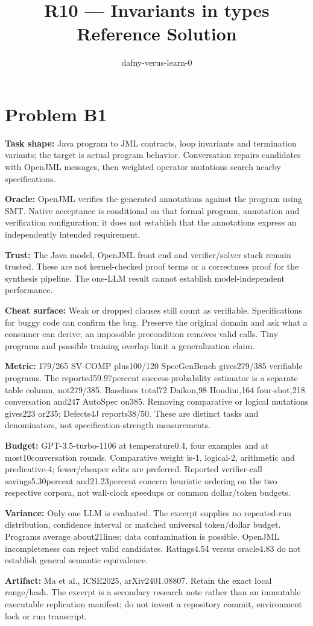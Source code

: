 \documentclass[11pt]{article}
\title{R10 --- Invariants in types \\ \large Reference Solution}
\author{dafny-verus-learn-0}
\date{}
\begin{document}
\maketitle
\section*{Problem B1}\label{ans:B1}
\begin{answer}
\textbf{Task shape:} Java program to JML contracts, loop invariants and termination variants; the target is actual program behavior. Conversation repairs candidates with OpenJML messages, then weighted operator mutations search nearby specifications.

\textbf{Oracle:} OpenJML verifies the generated annotations against the program using SMT. Native acceptance is conditional on that formal program, annotation and verification configuration; it does not establish that the annotations express an independently intended requirement.

\textbf{Trust:} The Java model, OpenJML front end and verifier/solver stack remain trusted. These are not kernel-checked proof terms or a correctness proof for the synthesis pipeline. The one-LLM result cannot establish model-independent performance.

\textbf{Cheat surface:} Weak or dropped clauses still count as verifiable. Specifications for buggy code can confirm the bug. Preserve the original domain and ask what a consumer can derive; an impossible precondition removes valid calls. Tiny programs and possible training overlap limit a generalization claim.

\textbf{Metric:} 179/265 SV-COMP plus100/120 SpecGenBench gives279/385 verifiable programs. The reported59.97percent success-probability estimator is a separate table column, not279/385. Baselines total72 Daikon,98 Houdini,164 four-shot,218 conversation and247 AutoSpec on385. Removing comparative or logical mutations gives223 or235; Defects4J reports38/50. These are distinct tasks and denominators, not specification-strength measurements.

\textbf{Budget:} GPT-3.5-turbo-1106 at temperature0.4, four examples and at most10conversation rounds. Comparative weight is-1, logical-2, arithmetic and predicative-4; fewer/cheaper edits are preferred. Reported verifier-call savings5.30percent and21.23percent concern heuristic ordering on the two respective corpora, not wall-clock speedups or common dollar/token budgets.

\textbf{Variance:} Only one LLM is evaluated. The excerpt supplies no repeated-run distribution, confidence interval or matched universal token/dollar budget. Programs average about21lines; data contamination is possible. OpenJML incompleteness can reject valid candidates. Ratings4.54 versus oracle4.83 do not establish general semantic equivalence.

\textbf{Artifact:} Ma et al., ICSE2025, arXiv2401.08807. Retain the exact local range/hash. The excerpt is a secondary research note rather than an immutable executable replication manifest; do not invent a repository commit, environment lock or run transcript.
\end{answer}
\end{document}
